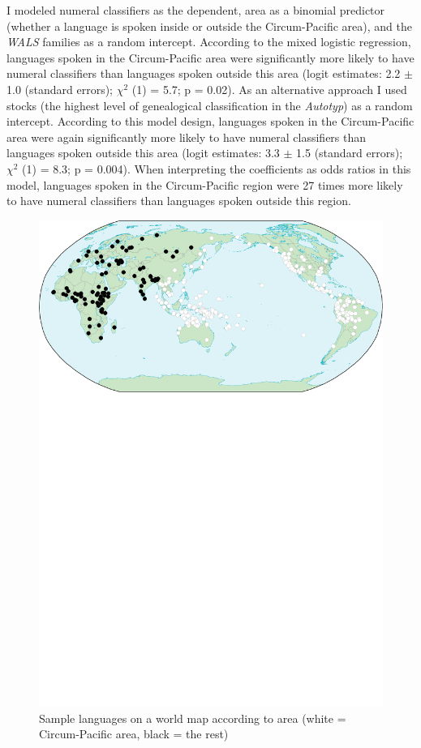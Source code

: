 \documentclass[output=collectionpaper]{langsci/langscibook}
\begin{document}
I modeled numeral classifiers as the dependent, area as a binomial predictor (whether a language is spoken inside or outside the Circum-Pacific area), and the \textit{WALS} families as a random intercept. According to the mixed logistic regression, languages spoken in the Circum-Pacific area were significantly more likely to have numeral classifiers than languages spoken outside this area (logit estimates: 2.2 $\pm$ 1.0 (standard errors); $\chi^2$ (1) = 5.7; p = 0.02). As an alternative approach I used stocks (the highest level of genealogical classification in the \textit{Autotyp}) as a random intercept. According to this model design, languages spoken in the Circum-Pacific area were again significantly more likely to have numeral classifiers than languages spoken outside this area (logit estimates: 3.3 $\pm$ 1.5 (standard errors); $\chi^2$ (1) = 8.3; p = 0.004). When interpreting the coefficients as odds ratios in this model, languages spoken in the Circum-Pacific region were 27 times more likely to have numeral classifiers than languages spoken outside this region.

\begin{figure}
\includegraphics[width=\textwidth]{figures/13/Fig4_MapCircumPacific_proofs}
\caption{Sample languages on a world map according to area (white = Circum-Pacific area, black = the rest)}
\label{fig:Sinne:4}
\end{figure}
\end{document}
